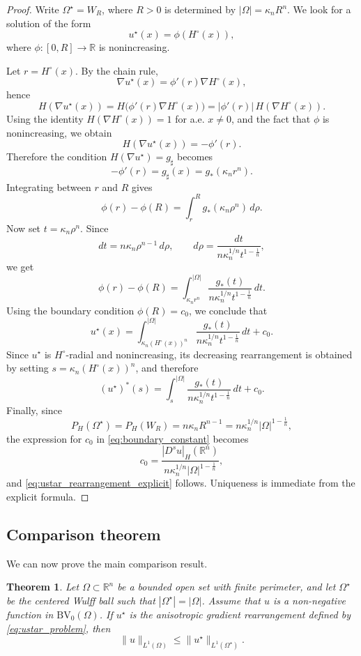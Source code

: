 \documentclass[oneside,a4paper,12pt,notitlepage]{article}
\newtheorem{theorem}{Theorem}[section]
\theoremstyle{definition}
\newcommand{\R}{\mathbb{R}}
\newcommand{\BV}{\text{BV}}
\begin{document}
\begin{proof}
Write $\Omega^\star=W_R$, where $R>0$ is determined by $|\Omega|=\kappa_n R^n$.
We look for a solution of the form
\[
u^\star(x)=\phi(H^\circ(x)),
\]
where $\phi:[0,R]\to\R$ is nonincreasing.

Let $r=H^\circ(x)$. By the chain rule,
\[
\nabla u^\star(x)=\phi'(r)\nabla H^\circ(x),
\]
hence
\[
H(\nabla u^\star(x))
=
H\bigl(\phi'(r)\nabla H^\circ(x)\bigr)
=
|\phi'(r)|\,H(\nabla H^\circ(x)).
\]
Using the identity $H(\nabla H^\circ(x))=1$ for a.e. $x\neq 0$, and the fact that
$\phi$ is nonincreasing, we obtain
\[
H(\nabla u^\star(x))=-\phi'(r).
\]
Therefore the condition $H(\nabla u^\star)=g_\sharp$ becomes
\[
-\phi'(r)=g_\sharp(x)=g_*(\kappa_n r^n).
\]
Integrating between $r$ and $R$ gives
\[
\phi(r)-\phi(R)=\int_r^R g_*(\kappa_n\rho^n)\,d\rho.
\]
Now set $t=\kappa_n\rho^n$. Since
\[
dt=n\kappa_n\rho^{n-1}\,d\rho,
\qquad
d\rho=\frac{dt}{n\kappa_n^{1/n}t^{1-\frac1n}},
\]
we get
\[
\phi(r)-\phi(R)
=
\int_{\kappa_n r^n}^{|\Omega|}
\frac{g_*(t)}{n\kappa_n^{1/n}t^{1-\frac1n}}\,dt.
\]
Using the boundary condition $\phi(R)=c_0$, we conclude that
\[
u^\star(x)
=
\int_{\kappa_n(H^\circ(x))^n}^{|\Omega|}
\frac{g_*(t)}{n\kappa_n^{1/n}t^{1-\frac1n}}\,dt
+
c_0.
\]
Since $u^\star$ is $H^\circ$-radial and nonincreasing, its decreasing rearrangement is
obtained by setting $s=\kappa_n(H^\circ(x))^n$, and therefore
\[
(u^\star)^*(s)
=
\int_s^{|\Omega|}
\frac{g_*(t)}{n\kappa_n^{1/n}t^{1-\frac1n}}\,dt
+
c_0.
\]
Finally, since
\[
P_H(\Omega^\star)=P_H(W_R)=n\kappa_n R^{n-1}
=
n\kappa_n^{1/n}|\Omega|^{1-\frac1n},
\]
the expression for $c_0$ in \eqref{eq:boundary_constant} becomes
\[
c_0
=
\frac{|D^s u|_H(\mathbb{R}^n)}{n\kappa_n^{1/n}|\Omega|^{1-\frac1n}},
\]
and \eqref{eq:ustar_rearrangement_explicit} follows. Uniqueness is immediate from
the explicit formula.
\end{proof}

\subsection{Comparison theorem}
\label{subsec:comparison}

We can now prove the main comparison result.

\begin{theorem}\label{thm:main_comparison}
Let $\Omega\subset\R^n$ be a bounded open set with finite perimeter, and let
$\Omega^\star$ be the centered Wulff ball such that $|\Omega^\star|=|\Omega|$.
Assume that $u$ is a non-negative function in $\BV_0(\Omega)$. If $u^\star$ is the
anisotropic gradient rearrangement defined by \eqref{eq:ustar_problem}, then
\begin{equation}\label{eq:main_inequality}
\|u\|_{L^1(\Omega)}\le \|u^\star\|_{L^1(\Omega^\star)}.
\end{equation}
\end{theorem}
\end{document}
